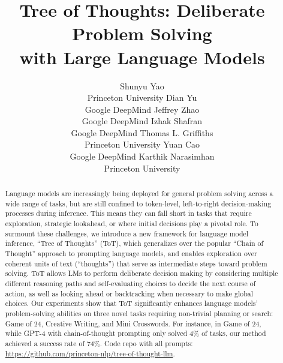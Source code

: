 \documentclass{article}
\title{Tree of Thoughts: Deliberate Problem Solving \\ with Large Language Models}
\author{%
  Shunyu Yao
    \\
  Princeton University
  \And Dian Yu \\ Google DeepMind
  \And Jeffrey Zhao \\ Google DeepMind
  \And Izhak Shafran \\ Google DeepMind
  \And Thomas L. Griffiths \\ Princeton University
  \And Yuan Cao \\ Google DeepMind
  \And Karthik Narasimhan \\ Princeton University
}
\begin{document}
\maketitle


\begin{abstract}
Language models are increasingly being deployed for general problem solving across a wide range of tasks, but are still confined to token-level, left-to-right decision-making processes during inference. This means they can fall short in tasks that require exploration, strategic lookahead, or where initial decisions play a pivotal role. 
To surmount these challenges, we introduce a new framework for language model inference, ``Tree of Thoughts'' (ToT), which generalizes over the popular ``Chain of Thought'' approach to prompting language models, and enables exploration over coherent units of text (``thoughts'') that serve as intermediate steps toward problem solving.
ToT allows LMs to perform deliberate decision making by considering multiple different reasoning paths and self-evaluating choices to decide the next course of action, as well as looking ahead or backtracking when necessary to make global choices.
Our experiments show that ToT significantly enhances language models’ problem-solving abilities on three novel tasks requiring non-trivial planning or search: Game of 24, Creative Writing, and Mini Crosswords. 
For instance, in Game of 24, while GPT-4 with chain-of-thought prompting only solved 4\% of tasks, our method achieved a success rate of 74\%.  Code repo with all prompts: \url{https://github.com/princeton-nlp/tree-of-thought-llm}.

\end{abstract}
\end{document}
